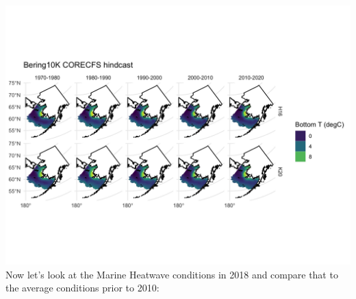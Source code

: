 \documentclass[
]{article}
\begin{document}
\includegraphics[width=1\textwidth,height=\textheight]{Figs/mn_hindcast_BT.jpg}
Now let's look at the Marine Heatwave conditions in 2018 and compare
that to the average conditions prior to 2010:
\end{document}
